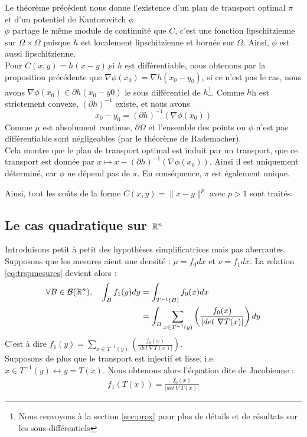 \documentclass[a4paper,12pt]{article}
\begin{document}
\begin{preuve}
Le théorème précédent nous donne l'existence d'un plan de transport optimal $\pi$ et d'un potentiel de Kantorovitch $\phi$.\\

$\phi$ partage le même module de continuité que $C$, c'est une fonction lipschitzienne sur $\Omega\times\Omega$ puisque $h$ est localement lipschitzienne et bornée sur $\Omega$. Ainsi, $\phi$ est aussi lipschitzienne.\\

Pour $C(x,y) = h(x-y)$,si $h$ est différentiable, nous obtenons par la proposition précédente que $\nabla\phi (x_0)=\nabla h(x_0-y_0)$, si ce n'est pas le cas, nous avons $\nabla\phi(x_0)\in\partial h(x_0-y0)$ le sous différentiel de $h$\footnote{Nous renvoyons à la section \ref{sec:prox} pour plus de détails et de résultats sur les sous-différentiels}. Comme $h$h est strictement convexe, $(\partial h)^{-1}$ existe, et nous avons 
$$
x_0-y_0=(\partial h)^{-1}(\nabla\phi(x_0))
$$
Comme $\mu$ est absolument continue, $\partial\Omega$ et l'ensemble des points ou $\phi$ n'est pas différentiable sont négligeables (par le théorème de Rademacher). \\

Cela montre que le plan de transport optimal est induit par un transport, que ce transport est donnée par $x\mapsto x -(\partial h)^{-1}(\nabla\phi(x_0))$. Ainsi il est uniquement déterminé, car $\phi$ ne dépend pas de $\pi$. En conséquence, $\pi$ est également unique. 
\end{preuve}
Ainsi, tout les coûts de la forme $C(x,y) =\|x-y\|^p$ avec $p>1$ sont traités. 


\subsection{Le cas quadratique sur $\mathbb{R}^n$}










 

\newpage



Introduisons petit à petit des hypothèses simplificatrices mais pas aberrantes. Supposons que les mesures aient une densité : $\mu = f_0 dx$ et $\nu = f_1 dx$. La relation \eqref{eq:trspmesures} devient alors : 
\begin{align*}
\forall B \in\mathcal{B}(\mathbb{R}^n),\quad \int_B f_1(y)dy&=\int_{T^{-1}(B)} f_0(x) dx \\
&= \int_B \sum_{x\in T^{-1}(y)} \left(\frac{f_0(x)}{|det\ \nabla T(x)|}\right)dy\\
\end{align*}
C'est à dire $f_1(y) = \sum_{x\in T^{-1}(y)} \left(\frac{f_0(x)}{|det\ \nabla T(x)|}\right)$.\\
Supposons de plus que le transport est injectif et lisse, i.e. $x\in T^{-1}(y) \leftrightarrow y=T(x)$. Nous obtenons alors l'équation dite de Jacobienne : 
\begin{align}
f_1(T(x)) = \frac{f_0(x)}{|det\ \nabla T(x)|}
\label{eq:jacobienne}
\end{align}
\end{document}
